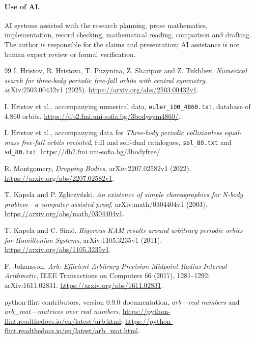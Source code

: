 \documentclass[10pt,a4paper]{article}
\theoremstyle{remark}
\begin{document}
\paragraph{Use of AI.}
AI systems assisted with the research planning, prose mathematics,
implementation, record checking, mathematical reading, comparison
and drafting. The author is responsible for the claims and presentation;
AI assistance is not human expert review or formal verification.

\begin{thebibliography}{99}
I. Hristov, R. Hristova, T. Puzynina, Z. Sharipov and Z. Tukhliev,
\emph{Numerical search for three-body periodic free-fall orbits with
central symmetry}, arXiv:2503.00432v1 (2025).
\url{https://arxiv.org/abs/2503.00432v1}.

I. Hristov et al., accompanying numerical data,
\texttt{euler\_100\_4860.txt}, database of 4,860 orbits.
\url{https://db2.fmi.uni-sofia.bg/3bodysym4860/}.

I. Hristov et al., accompanying data for \emph{Three-body periodic
collisionless equal-mass free-fall orbits revisited}, full and self-dual
catalogues, \texttt{sol\_80.txt} and \texttt{sd\_80.txt}.
\url{https://db2.fmi.uni-sofia.bg/3bodyfree/}.

R. Montgomery, \emph{Dropping Bodies}, arXiv:2207.02582v1 (2022).
\url{https://arxiv.org/abs/2207.02582v1}.

T. Kapela and P. Zgliczy\'nski,
\emph{An existence of simple choreographies for N-body problem---a
computer assisted proof}, arXiv:math/0304404v1 (2003).
\url{https://arxiv.org/abs/math/0304404v1}.

T. Kapela and C. Sim\'o,
\emph{Rigorous KAM results around arbitrary periodic orbits for
Hamiltonian Systems}, arXiv:1105.3235v1 (2011).
\url{https://arxiv.org/abs/1105.3235v1}.

F. Johansson, \emph{Arb: Efficient Arbitrary-Precision Midpoint-Radius
Interval Arithmetic}, IEEE Transactions on Computers 66 (2017),
1281--1292; arXiv:1611.02831.
\url{https://arxiv.org/abs/1611.02831}.

python-flint contributors, version 0.9.0 documentation,
\emph{arb---real numbers} and \emph{arb\_mat---matrices over real numbers}.
\url{https://python-flint.readthedocs.io/en/latest/arb.html};
\url{https://python-flint.readthedocs.io/en/latest/arb_mat.html}.


\end{thebibliography}
\end{document}
